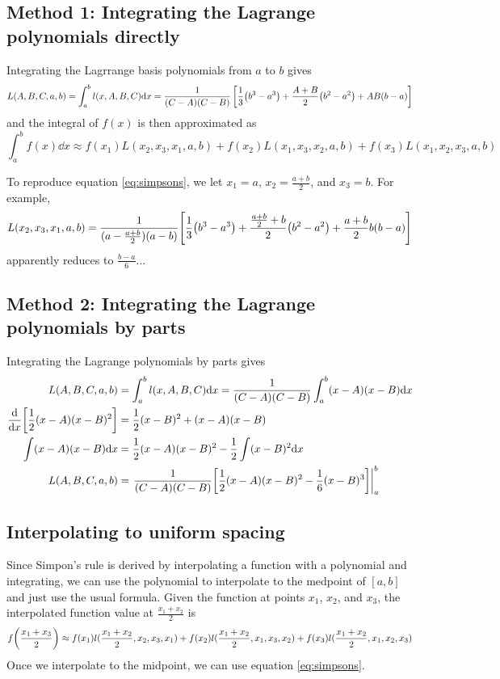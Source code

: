 \documentclass[letterpaper,10pt]{article}
\begin{document}
\subsection{Method 1: Integrating the Lagrange polynomials directly}
Integrating the Lagrrange basis polynomials from $a$ to $b$ gives
\begin{equation}
  L(A,B,C,a,b) = \int_a^b l(x,A,B,C) \dd x = \frac{1}{(C-A)(C-B)} \left[ \frac{1}{3} \qty(b^3 - a^3) + \frac{A+B}{2}\qty(b^2 - a^2) + AB(b-a)  \right]
\end{equation}
and the integral of $f(x)$ is then approximated as
\begin{equation}
  \int_a^b f(x) \dd x \approx
    f(x_1) L(x_2,x_3,x_1,a,b)
  + f(x_2) L(x_1,x_3,x_2,a,b)
  + f(x_3) L(x_1,x_2,x_3,a,b)
\end{equation}

To reproduce equation \ref{eq:simpsons}, we let $x_1 = a$, $x_2 = \frac{a+b}{2}$, and $x_3 = b$. For example,
\begin{align}
  L(x_2,x_3,x_1,a,b) = \frac{1}{(a-\frac{a+b}{2})(a-b)} \qty[\frac{1}{3} \qty(b^3 - a^3) + \frac{\frac{a+b}{2} + b}{2}\qty(b^2 - a^2) + \frac{a+b}{2}b\qty(b-a) ]
\end{align}
apparently reduces to $\frac{b-a}{6}$...


\subsection{Method 2: Integrating the Lagrange polynomials by parts}

Integrating the Lagrange polynomials by parts gives
\begin{align}
  L(A,B,C,a,b) &= \int_a^b l(x,A,B,C) \dd x = \frac{1}{(C-A)(C-B)} \int_a^b (x - A)(x - B) \dd x  \\
  \dv{x} \qty[\frac{1}{2}(x-A)(x-B)^2] &= \frac{1}{2}(x - B)^2 + (x-A)(x-B) \\
  \int (x-A)(x-B) \dd x &= \frac{1}{2}(x-A)(x-B)^2 - \frac{1}{2} \int (x-B)^2 \dd x \\
  L(A,B,C,a,b) &= \left. \frac{1}{(C-A)(C-B)} \qty[ \frac{1}{2}(x-A)(x-B)^2 - \frac{1}{6} (x-B)^3] \right|_a^b
\end{align}

\subsection{Interpolating to uniform spacing}

Since Simpon's rule is derived by interpolating a function with a polynomial and integrating, we can use the polynomial to interpolate to the
medpoint of $[a,b]$ and just use the usual formula. Given the function at points $x_1$, $x_2$, and $x_3$, the interpolated function value at $\frac{x_1 + x_2}{2}$ is
\begin{equation}
  f\qty(\frac{x_1 + x_3}{2}) \approx 
  f(x_1) l( \frac{x_1+x_2}{2}, x_2,x_3,x_1)
  + f(x_2) l( \frac{x_1+x_2}{2}, x_1,x_3,x_2)
  + f(x_3) l( \frac{x_1+x_2}{2}, x_1,x_2,x_3)
\end{equation}
Once we interpolate to the midpoint, we can use equation \ref{eq:simpsons}.
\end{document}
